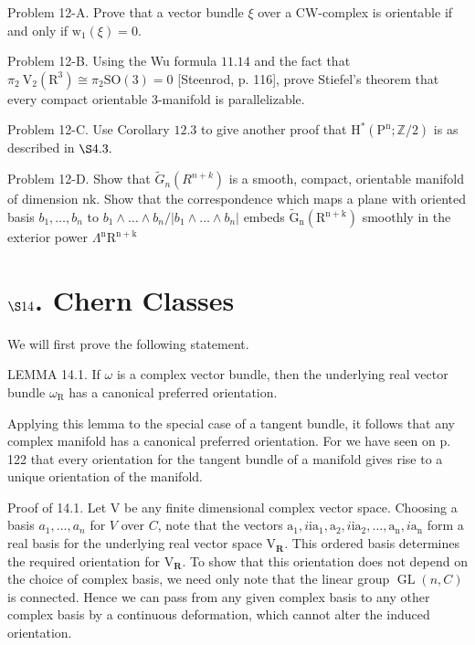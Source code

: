 \documentclass[10pt]{article}
\begin{document}
Problem 12-A. Prove that a vector bundle $\xi$ over a CW-complex is orientable if and only if $\mathrm{w}_{1}(\xi)=0$.

Problem 12-B. Using the Wu formula $11.14$ and the fact that $\pi_{2} \mathrm{~V}_{2}\left(\mathrm{R}^{3}\right) \cong \pi_{2} \mathrm{SO}(3)=0$ [Steenrod, p. 116], prove Stiefel's theorem that every compact orientable 3-manifold is parallelizable.

Problem 12-C. Use Corollary $12.3$ to give another proof that $\mathrm{H}^{*}\left(\mathrm{P}^{\mathrm{n}} ; \mathbb{Z} / 2\right)$ is as described in $\S 4.3 .$

Problem 12-D. Show that $\widetilde{G}_{n}\left(R^{n+k}\right)$ is a smooth, compact, orientable manifold of dimension $\mathrm{nk}$. Show that the correspondence which maps a plane with oriented basis $b_{1}, \ldots, b_{n}$ to $b_{1} \wedge \ldots \wedge b_{n} /\left|b_{1} \wedge \ldots \wedge b_{n}\right|$ embeds $\widetilde{\mathrm{G}}_{\mathrm{n}}\left(\mathrm{R}^{\mathrm{n}+\mathrm{k}}\right)$ smoothly in the exterior power $\Lambda^{\mathrm{n}} \mathrm{R}^{\mathrm{n}+\mathrm{k}}$

\section{$\S 14$. Chern Classes}
We will first prove the following statement.

LEMMA 14.1. If $\omega$ is a complex vector bundle, then the underlying real vector bundle $\omega_{\mathrm{R}}$ has a canonical preferred orientation.

Applying this lemma to the special case of a tangent bundle, it follows that any complex manifold has a canonical preferred orientation. For we have seen on p. 122 that every orientation for the tangent bundle of a manifold gives rise to a unique orientation of the manifold.

Proof of 14.1. Let $\mathrm{V}$ be any finite dimensional complex vector space. Choosing a basis $a_{1}, \ldots, a_{n}$ for $V$ over $C$, note that the vectors $\mathrm{a}_{1}, i \mathrm{ia}_{1}, \mathrm{a}_{2}, i \mathrm{ia}_{2}, \ldots, \mathrm{a}_{\mathrm{n}}, i \mathrm{a}_{\mathrm{n}}$ form a real basis for the underlying real vector space $\mathrm{V}_{\mathbf{R}}$. This ordered basis determines the required orientation for $\mathrm{V}_{\mathbf{R}}$. To show that this orientation does not depend on the choice of complex basis, we need only note that the linear group $\operatorname{GL}(n, C)$ is connected. Hence we can pass from any given complex basis to any other complex basis by a continuous deformation, which cannot alter the induced orientation.
\end{document}
